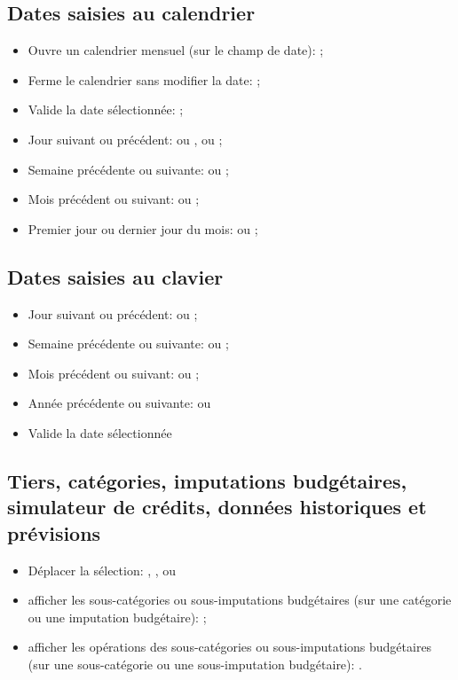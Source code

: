 \subsection{Dates saisies au calendrier}

\begin{itemize}
	\item Ouvre un calendrier mensuel (sur le champ de date): ;
	\item Ferme le calendrier sans modifier la date: ;
	\item Valide la date sélectionnée: ;
	\item Jour suivant ou précédent: \key{+} ou \key{-},  ou ;
	\item Semaine précédente ou suivante:  ou ;
	\item Mois précédent ou suivant:  ou ;
	\item Premier jour ou dernier jour du mois:  ou ;
\end{itemize}


\subsection{Dates saisies au clavier}

\begin{itemize}
	\item Jour suivant ou précédent: \key{+} ou \key{-};
	\item Semaine précédente ou suivante:  \key{+} ou  \key{-};
	\item Mois précédent ou suivant:  ou ;
	\item Année précédente ou suivante:   ou  
	\item Valide la date sélectionnée 
\end{itemize}


\subsection{Tiers, catégories, imputations budgétaires, simulateur de crédits, données historiques et prévisions}

\begin{itemize}
	\item Déplacer la sélection: , ,  ou 
	\item afficher les sous-catégories ou sous-imputations budgétaires (sur une catégorie ou une imputation budgétaire): \key{+};
	\item afficher les opérations des sous-catégories ou sous-imputations budgétaires (sur une sous-catégorie ou une sous-imputation budgétaire): .
\end{itemize}


